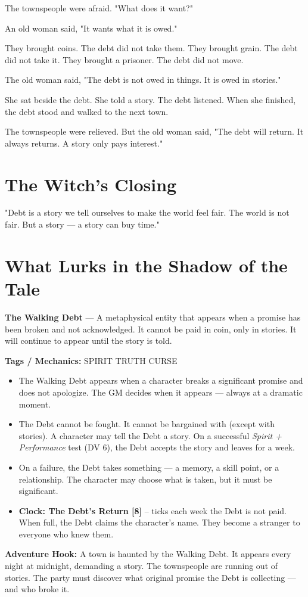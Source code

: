 \documentclass[10pt,twoside]{book}
\newcommand{\tag}[1]{\textsc{#1}}
\begin{document}
The townspeople were afraid. "What does it want?"

An old woman said, "It wants what it is owed."

They brought coins. The debt did not take them. They brought grain. The debt did not take it. They brought a prisoner. The debt did not move.

The old woman said, "The debt is not owed in things. It is owed in stories."

She sat beside the debt. She told a story. The debt listened. When she finished, the debt stood and walked to the next town.

The townspeople were relieved. But the old woman said, "The debt will return. It always returns. A story only pays interest."

\section*{The Witch's Closing}
"Debt is a story we tell ourselves to make the world feel fair. The world is not fair. But a story --- a story can buy time."

\section*{What Lurks in the Shadow of the Tale}
\begin{infobox}
\textbf{The Walking Debt} --- A metaphysical entity that appears when a promise has been broken and not acknowledged. It cannot be paid in coin, only in stories. It will continue to appear until the story is told.

\textbf{Tags / Mechanics:} \tag{SPIRIT} \tag{TRUTH} \tag{CURSE}

\begin{itemize}
\item The Walking Debt appears when a character breaks a significant promise and does not apologize. The GM decides when it appears --- always at a dramatic moment.
\item The Debt cannot be fought. It cannot be bargained with (except with stories). A character may tell the Debt a story. On a successful \textit{Spirit + Performance} test (DV 6), the Debt accepts the story and leaves for a week.
\item On a failure, the Debt takes something --- a memory, a skill point, or a relationship. The character may choose what is taken, but it must be significant.
\item \textbf{Clock: The Debt's Return [8]} -- ticks each week the Debt is not paid. When full, the Debt claims the character's name. They become a stranger to everyone who knew them.
\end{itemize}

\textbf{Adventure Hook:} A town is haunted by the Walking Debt. It appears every night at midnight, demanding a story. The townspeople are running out of stories. The party must discover what original promise the Debt is collecting --- and who broke it.
\end{infobox}
\end{document}
